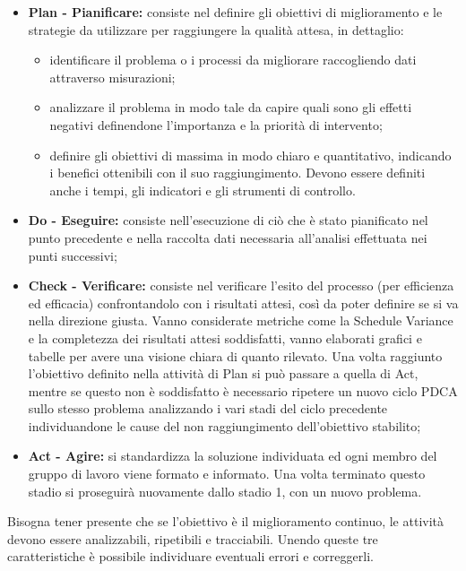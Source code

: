 \documentclass[PianoDiQualifica.tex]{subfiles}
\begin{document}
\begin{itemize}
\item \textbf{Plan - Pianificare:} consiste nel definire gli obiettivi di miglioramento e le strategie da utilizzare per raggiungere la qualità attesa, in dettaglio:
\begin{itemize}
	\item identificare il problema o i processi da migliorare raccogliendo dati attraverso misurazioni;
	\item analizzare il problema in modo tale da capire quali sono gli effetti negativi definendone l'importanza e la priorità di intervento;
	\item definire gli obiettivi di massima in modo chiaro e quantitativo, indicando i benefici ottenibili con il suo raggiungimento. Devono essere definiti anche i tempi, gli indicatori e gli strumenti di controllo.
\end{itemize}
\item \textbf{Do - Eseguire:} consiste nell'esecuzione di ciò che è stato pianificato nel punto precedente e nella raccolta dati necessaria all'analisi effettuata nei punti successivi;
\item \textbf{ Check - Verificare:} consiste nel verificare l’esito del processo (per
efficienza ed efficacia) confrontandolo con i risultati attesi, così da poter definire se si va nella direzione giusta.  Vanno considerate metriche come la Schedule Variance e la completezza dei risultati attesi soddisfatti, vanno elaborati grafici e tabelle per avere una visione chiara di quanto rilevato. Una volta raggiunto l'obiettivo definito nella attività di Plan si può passare a quella di Act, mentre se questo non è soddisfatto è necessario ripetere un nuovo ciclo PDCA sullo stesso problema analizzando i vari stadi del ciclo precedente individuandone le cause del non raggiungimento dell’obiettivo stabilito;
\item \textbf{ Act - Agire:} si standardizza la soluzione individuata ed ogni membro del gruppo di lavoro viene formato e informato. Una volta terminato questo stadio si proseguirà nuovamente dallo stadio 1, con un nuovo problema.
\end{itemize}

Bisogna tener presente che se l’obiettivo è il miglioramento continuo, le attività devono essere analizzabili, ripetibili e tracciabili. Unendo queste tre caratteristiche è possibile individuare eventuali errori e correggerli.
\end{document}
